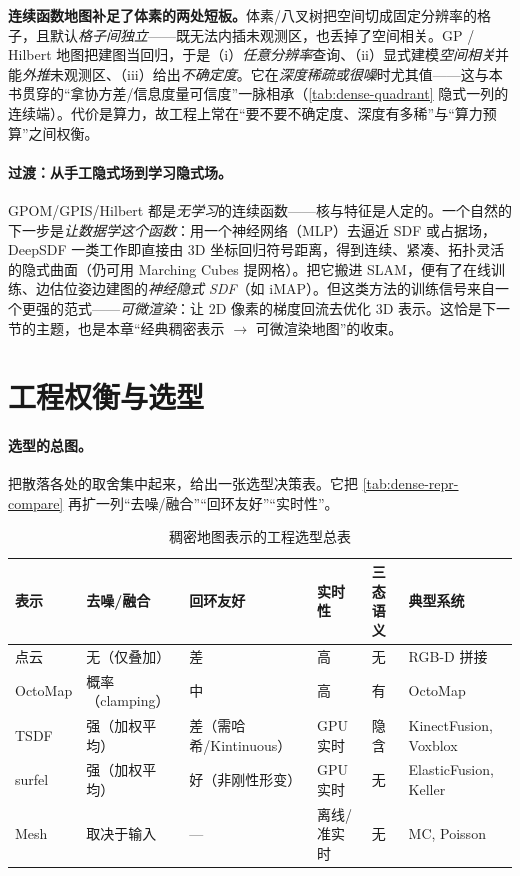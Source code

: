 \begin{insight}
\textbf{连续函数地图补足了体素的两处短板。}体素/八叉树把空间切成固定分辨率的格子，且默认\emph{格子间独立}——既无法内插未观测区，也丢掉了空间相关。GP / Hilbert 地图把建图当回归，于是（i）\emph{任意分辨率}查询、（ii）显式建模\emph{空间相关}并能\emph{外推}未观测区、（iii）给出\emph{不确定度}。它在\emph{深度稀疏或很噪}时尤其值——这与本书贯穿的“拿协方差/信息度量可信度”一脉相承（\cref{tab:dense-quadrant} 隐式一列的连续端）。代价是算力，故工程上常在“要不要不确定度、深度有多稀”与“算力预算”之间权衡。
\end{insight}

\paragraph{过渡：从手工隐式场到学习隐式场。}
GPOM/GPIS/Hilbert 都是\emph{无学习}的连续函数——核与特征是人定的。一个自然的下一步是\emph{让数据学这个函数}：用一个神经网络（MLP）去逼近 SDF 或占据场，DeepSDF\cite{park2019deepsdf} 一类工作即直接由 3D 坐标回归符号距离，得到连续、紧凑、拓扑灵活的隐式曲面（仍可用 Marching Cubes 提网格）。把它搬进 SLAM，便有了在线训练、边估位姿边建图的\emph{神经隐式 SDF}（如 iMAP\cite{sucar2021imap}）。但这类方法的训练信号来自一个更强的范式——\emph{可微渲染}：让 2D 像素的梯度回流去优化 3D 表示。这恰是下一节的主题，也是本章“经典稠密表示 $\to$ 可微渲染地图”的收束。

\section{工程权衡与选型}
\label{sec:dense-engineering}

\paragraph{选型的总图。}
把散落各处的取舍集中起来，给出一张选型决策表。它把 \cref{tab:dense-repr-compare} 再扩一列“去噪/融合”“回环友好”“实时性”。

\begin{table}[H]\centering\small
\caption{稠密地图表示的工程选型总表}
\label{tab:dense-engineering}
\begin{tabular}{p{} p{} p{} p{} p{} p{}}
\toprule
表示 & 去噪/融合 & 回环友好 & 实时性 & 三态语义 & 典型系统 \\
\midrule
点云 & 无（仅叠加） & 差 & 高 & 无 & RGB-D 拼接 \\
OctoMap & 概率（clamping） & 中 & 高 & 有 & OctoMap \\
TSDF & 强（加权平均） & 差（需哈希/Kintinuous） & GPU 实时 & 隐含 & KinectFusion, Voxblox \\
surfel & 强（加权平均） & 好（非刚性形变） & GPU 实时 & 无 & ElasticFusion, Keller \\
Mesh & 取决于输入 & --- & 离线/准实时 & 无 & MC, Poisson \\
\bottomrule
\end{tabular}
\end{table}

